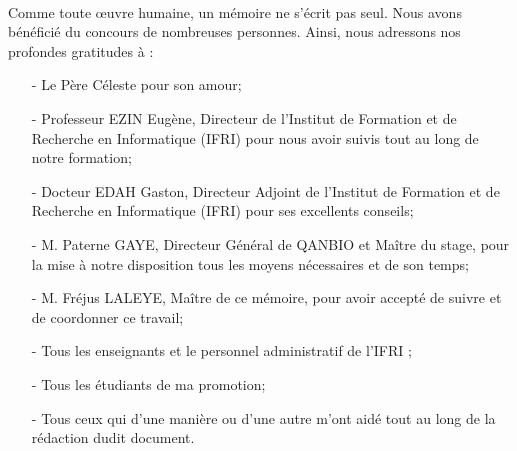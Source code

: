\remerciements


\paragraph{}
Comme toute œuvre humaine, un mémoire ne s’écrit pas seul. Nous avons bénéficié du concours de nombreuses personnes.
Ainsi, nous adressons nos profondes gratitudes à :

\begin{itemize}
	\item[-] Le Père Céleste pour son amour;
	\item[-] Professeur EZIN Eugène, Directeur de l'Institut de Formation et de Recherche en Informatique (IFRI) pour nous avoir suivis tout au long de notre formation;
	\item[-] Docteur EDAH Gaston, Directeur Adjoint de l'Institut de Formation et de Recherche en Informatique (IFRI) pour ses excellents conseils;
	\item[-] M. Paterne GAYE, Directeur Général de QANBIO et Maître du stage, pour la mise à notre disposition tous les moyens nécessaires et de son temps;
	\item[-] M. Fréjus LALEYE,  Maître de ce mémoire, pour avoir accepté de suivre et de coordonner ce travail;
	\item[-] Tous les enseignants et le personnel administratif de l'IFRI ;
	\item[-] Tous les étudiants de ma promotion;
	\item[-] Tous ceux qui d'une manière ou d'une autre m'ont aidé tout au long de la rédaction dudit document.
\end{itemize}